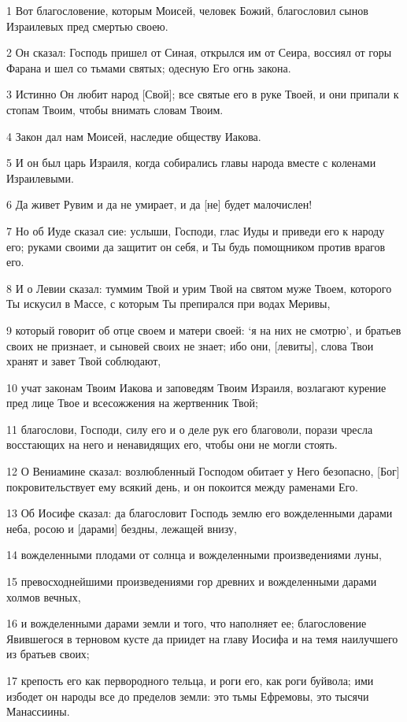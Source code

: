 \par 1 Вот благословение, которым Моисей, человек Божий, благословил сынов Израилевых пред смертью своею.
\par 2 Он сказал: Господь пришел от Синая, открылся им от Сеира, воссиял от горы Фарана и шел со тьмами святых; одесную Его огнь закона.
\par 3 Истинно Он любит народ [Свой]; все святые его в руке Твоей, и они припали к стопам Твоим, чтобы внимать словам Твоим.
\par 4 Закон дал нам Моисей, наследие обществу Иакова.
\par 5 И он был царь Израиля, когда собирались главы народа вместе с коленами Израилевыми.
\par 6 Да живет Рувим и да не умирает, и да [не] будет малочислен!
\par 7 Но об Иуде сказал сие: услыши, Господи, глас Иуды и приведи его к народу его; руками своими да защитит он себя, и Ты будь помощником против врагов его.
\par 8 И о Левии сказал: туммим Твой и урим Твой на святом муже Твоем, которого Ты искусил в Массе, с которым Ты препирался при водах Меривы,
\par 9 который говорит об отце своем и матери своей: `я на них не смотрю', и братьев своих не признает, и сыновей своих не знает; ибо они, [левиты], слова Твои хранят и завет Твой соблюдают,
\par 10 учат законам Твоим Иакова и заповедям Твоим Израиля, возлагают курение пред лице Твое и всесожжения на жертвенник Твой;
\par 11 благослови, Господи, силу его и о деле рук его благоволи, порази чресла восстающих на него и ненавидящих его, чтобы они не могли стоять.
\par 12 О Вениамине сказал: возлюбленный Господом обитает у Него безопасно, [Бог] покровительствует ему всякий день, и он покоится между раменами Его.
\par 13 Об Иосифе сказал: да благословит Господь землю его вожделенными дарами неба, росою и [дарами] бездны, лежащей внизу,
\par 14 вожделенными плодами от солнца и вожделенными произведениями луны,
\par 15 превосходнейшими произведениями гор древних и вожделенными дарами холмов вечных,
\par 16 и вожделенными дарами земли и того, что наполняет ее; благословение Явившегося в терновом кусте да приидет на главу Иосифа и на темя наилучшего из братьев своих;
\par 17 крепость его как первородного тельца, и роги его, как роги буйвола; ими избодет он народы все до пределов земли: это тьмы Ефремовы, это тысячи Манассиины.
